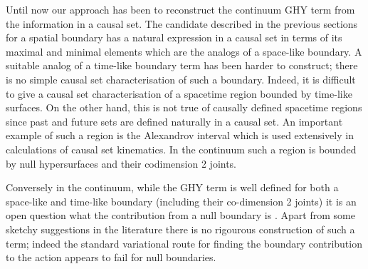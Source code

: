 \documentclass[12pt]{article}
\begin{document}
Until now our approach has been to reconstruct the  continuum GHY term  from the information in a causal set. 
The candidate described in the previous sections for a spatial boundary has a natural expression in a causal set  in  terms of its maximal and minimal elements which are the  analogs of a  space-like boundary.  A suitable analog  of  a time-like boundary  term has been harder to  construct; there is no simple causal set  characterisation of such  a boundary. Indeed, it is difficult to give a causal set  characterisation of a  spacetime region bounded by time-like surfaces. On the other hand, this is not true of causally defined spacetime regions since  past and future sets are defined naturally in  a causal set. An important example of such a region is the  Alexandrov interval which is used extensively  in calculations of causal set kinematics.  In the continuum such a region  is bounded by null hypersurfaces and their codimension 2 joints.  

Conversely in the continuum, while the GHY term  is well defined for both a space-like and time-like boundary  (including their co-dimension 2 joints)  it is an open question what the contribution from a null  boundary  is \cite{Gibbons_Hawking_Boundary, Harris}. Apart from some sketchy suggestions in the literature \cite{neiman} there is no rigourous construction of such a term; indeed the standard variational route for finding the boundary contribution to the action appears to fail for null boundaries. 
\end{document}

